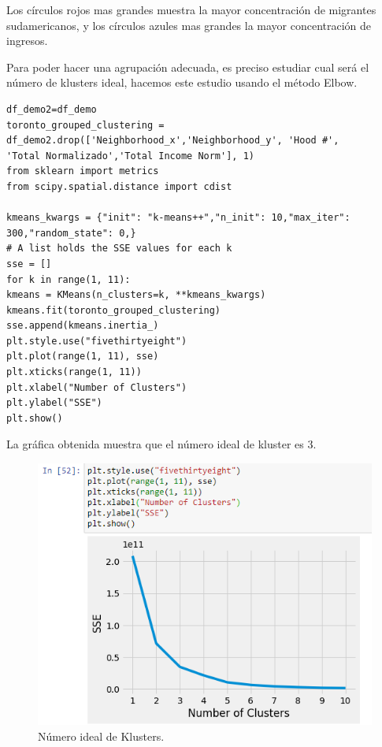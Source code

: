 \documentclass[10pt,a4paper,arial, spanish]{article}
\begin{document}
Los círculos rojos mas grandes muestra la mayor concentración de migrantes sudamericanos, y los círculos azules mas grandes la mayor concentración de ingresos.

Para poder hacer una agrupación adecuada, es preciso estudiar cual será el número de klusters ideal, hacemos este estudio usando el método Elbow.
\begin{verbatim}
df_demo2=df_demo
toronto_grouped_clustering = df_demo2.drop(['Neighborhood_x','Neighborhood_y', 'Hood #', 
'Total Normalizado','Total Income Norm'], 1)
from sklearn import metrics
from scipy.spatial.distance import cdist

kmeans_kwargs = {"init": "k-means++","n_init": 10,"max_iter": 300,"random_state": 0,}
# A list holds the SSE values for each k
sse = []
for k in range(1, 11):
kmeans = KMeans(n_clusters=k, **kmeans_kwargs)
kmeans.fit(toronto_grouped_clustering)
sse.append(kmeans.inertia_)
plt.style.use("fivethirtyeight")
plt.plot(range(1, 11), sse)
plt.xticks(range(1, 11))
plt.xlabel("Number of Clusters")
plt.ylabel("SSE")
plt.show()
\end{verbatim}
La gráfica obtenida muestra que el número ideal de kluster es 3.
\begin{figure}[H]
	\centering
	\includegraphics[scale=0.45]{graf1}
	\caption[Número ideal de Klusters.]{Número ideal de Klusters.}
	\label{fig:graf1}
\end{figure}
\end{document}

